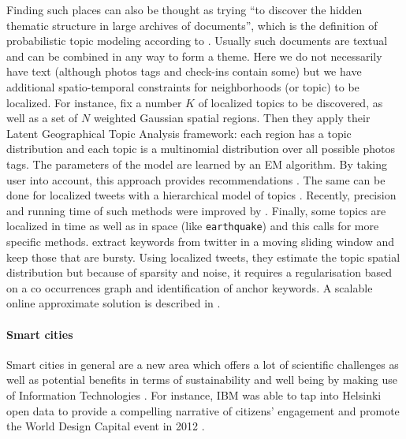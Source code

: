 Finding such places can also be thought as trying \enquote{to discover the
hidden thematic structure in large archives of documents}, which is the
definition of probabilistic topic modeling according to \textcite{topicModel}.
Usually such documents are textual and can be combined in any way to form a
theme. Here we do not necessarily have text (although photos tags and check-ins
contain some) but we have additional spatio-temporal constraints for
neighborhoods (or topic) to be localized. For instance,
\textcite{GeoTopicYin11} fix a number $K$ of localized topics to be discovered,
as well as a set of $N$ weighted Gaussian spatial regions. Then they apply
their Latent Geographical Topic Analysis framework: each region has a topic
distribution and each topic is a multinomial distribution over all possible
photos tags. The parameters of the model are learned by an EM algorithm. By
taking user into account, this approach provides recommendations
\autocite{GeoTopicKurashima2013}. The same can be done for localized tweets
with a hierarchical model of topics \autocite{nestedChinese13}. Recently,
precision and running time of such methods were improved by
\textcite{NonGaussianTopicKling14}. Finally, some topics are localized in time
as well as in space (like \texttt{earthquake}) and this calls for more specific
methods. \Textcite{TwitterBurst13} extract keywords from twitter in a moving
sliding window and keep those that are bursty. Using localized tweets, they
estimate the topic spatial distribution but because of sparsity and noise, it
requires a regularisation based on a co occurrences graph and identification of
anchor keywords. A scalable online approximate solution is described in
\autocite{GeoScope}.

\paragraph{Smart cities}

Smart cities in general are a new area which offers a lot of scientific
challenges \autocite[Chapter 4]{Eunoia13} as well as potential benefits in
terms of sustainability and well being by making use of Information
Technologies \autocite{SmartCities13}. For instance, IBM was able to tap into Helsinki
open data to provide a compelling narrative of citizens' engagement and promote
the World Design Capital event in 2012 \autocite{HelsinkiSCC11}.


